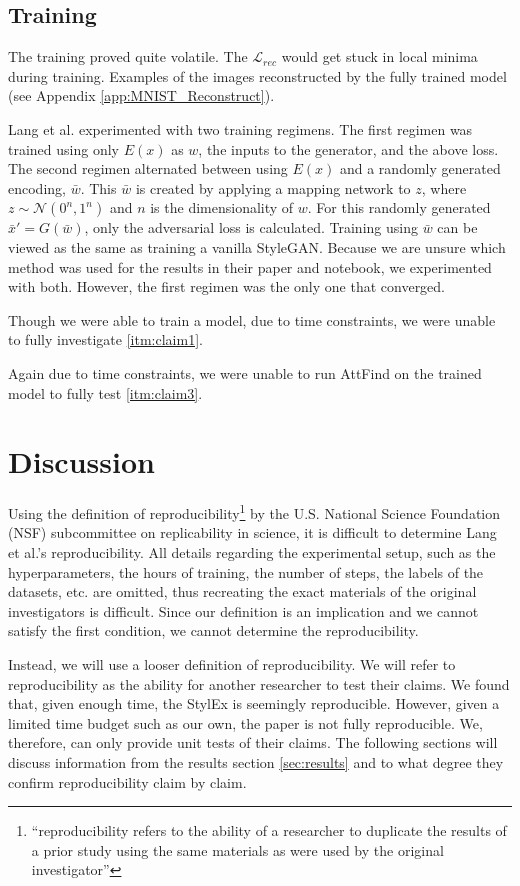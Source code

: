 \subsection{Training}
The training proved quite volatile. The $\mathcal{L}_{rec}$ would get stuck in local minima during training. Examples of the images reconstructed by the fully trained model (see Appendix \ref{app:MNIST_Reconstruct}).

Lang et al. experimented with two training regimens. The first regimen was trained using only $E(x)$ as $w$, the inputs to the generator, and the above loss. The second regimen alternated between using $E(x)$ and a randomly generated encoding, $\bar w$. This $\bar w$ is created by applying a mapping network to $z$, where $z \sim \mathcal{N}(0^n,1^n)$ and $n$ is the dimensionality of $w$. For this randomly generated $\bar x' = G(\bar w)$, only the adversarial loss is calculated. Training using $\bar w$ can be viewed as the same as training a vanilla StyleGAN. Because we are unsure which method was used for the results in their paper and notebook, we experimented with both. However, the first regimen was the only one that converged.

Though we were able to train a model, due to time constraints, we were unable to fully investigate \ref{itm:claim1}.

Again due to time constraints, we were unable to run AttFind on the trained model to fully test \ref{itm:claim3}.

\section{Discussion}
Using the definition of reproducibility\footnote{“reproducibility refers to the ability of a researcher to duplicate the results of a prior study using the same materials as were used by the original investigator”} by the U.S. National Science Foundation (NSF) subcommittee on replicability in science, it is difficult to determine Lang et al.'s reproducibility. All details regarding the experimental setup, such as the hyperparameters, the hours of training, the number of steps, the labels of the datasets, etc. are omitted, thus recreating the exact materials of the original investigators is difficult. Since our definition is an implication and we cannot satisfy the first condition, we cannot determine the reproducibility.

Instead, we will use a looser definition of reproducibility. We will refer to reproducibility as the ability for another researcher to test their claims. We found that, given enough time, the StylEx is seemingly reproducible. However, given a limited time budget such as our own, the paper is not fully reproducible. We, therefore, can only provide unit tests of their claims. The following sections will discuss information from the results section \ref{sec:results} and to what degree they confirm reproducibility claim by claim.

